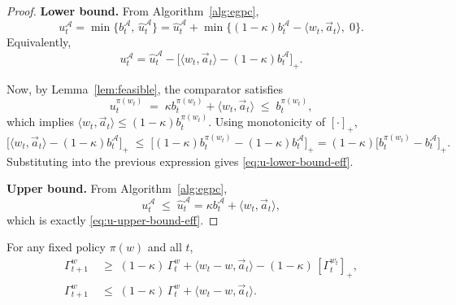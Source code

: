 \begin{proof}
\textbf{Lower bound.}
From Algorithm~\ref{alg:egpc},
\[
u_t^\mathcal{A}
= \min\!\bigl\{ b_t^\mathcal{A},\, \widehat{u}_t^\mathcal{A} \bigr\}
= \widehat{u}_t^\mathcal{A} + \min\!\bigl\{ (1-\kappa)b_t^\mathcal{A}-\langle w_t,\vec{a}_t\rangle,\; 0 \bigr\}.
\]
Equivalently,
\[
u_t^\mathcal{A}
= \widehat{u}_t^\mathcal{A} - \big[\langle w_t,\vec{a}_t\rangle - (1-\kappa)b_t^\mathcal{A}\big]_+ .
\]

Now, by Lemma~\ref{lem:feasible}, the comparator satisfies
\[
u_t^{\pi(w_t)} \;=\; \kappa b_t^{\pi(w_t)} + \langle w_t,\vec{a}_t\rangle \;\le\; b_t^{\pi(w_t)},
\]
which implies
\(\langle w_t,\vec{a}_t\rangle \le (1-\kappa)b_t^{\pi(w_t)}\).
Using monotonicity of \([\cdot]_+\),
\[
\big[\langle w_t,\vec{a}_t\rangle - (1-\kappa)b_t^\mathcal{A}\big]_+
\;\le\;
\big[(1-\kappa)b_t^{\pi(w_t)} - (1-\kappa)b_t^\mathcal{A}\big]_+
= (1-\kappa)\big[b_t^{\pi(w_t)} - b_t^\mathcal{A}\big]_+.
\]
Substituting into the previous expression gives \eqref{eq:u-lower-bound-eff}.

\medskip
\noindent
\textbf{Upper bound.}
From Algorithm~\ref{alg:egpc},
\[
u_t^\mathcal{A} \;\le\; \widehat{u}_t^\mathcal{A}
= \kappa b_t^\mathcal{A} + \langle w_t, \vec{a}_t\rangle,
\]
which is exactly \eqref{eq:u-upper-bound-eff}.
\end{proof}




\begin{Thm:Lemma}
\label{lem:state-gap-recursion-eff}
For any fixed policy \(\pi(w)\) and all \(t\),
\begin{align}
\label{eq:GAMMA-Lower}
\Gamma_{t+1}^w
&\;\ge\;
(1-\kappa)\,\Gamma_{t}^w
+\langle w_t - w, \vec{a}_t\rangle
-(1-\kappa)\,[\Gamma_{t}^{w_t}]_+ , \\[4pt]
\label{eq:GAMMA-Upper}
\Gamma_{t+1}^w
&\;\le\;
(1-\kappa)\,\Gamma_{t}^w
+\langle w_t - w, \vec{a}_t\rangle .
\end{align}
\end{Thm:Lemma}

